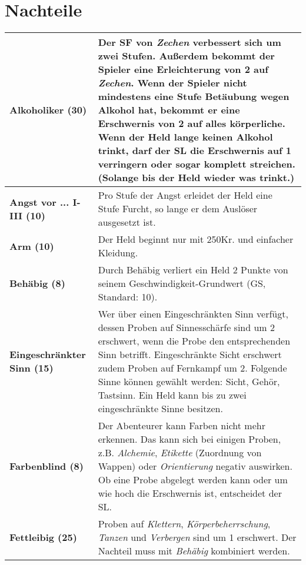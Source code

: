 \section{Nachteile}
\label{chap:nachteile}
\begin{longtable}{|p{5cm}|p{11cm}|}
\hline

\textbf{Alkoholiker (30)} & Der SF von \textit{Zechen} verbessert sich um zwei Stufen. Außerdem bekommt der Spieler eine Erleichterung von 2 auf \textit{Zechen}. Wenn der Spieler nicht mindestens eine Stufe Betäubung wegen Alkohol hat, bekommt er eine Erschwernis von 2 auf alles körperliche. Wenn der Held lange keinen Alkohol trinkt, darf der SL die Erschwernis auf 1 verringern oder sogar komplett streichen. (Solange bis der Held wieder was trinkt.) \\ \hline

\textbf{Angst vor ... I-III (10)} & Pro Stufe der Angst erleidet der Held eine Stufe Furcht, so lange er dem Auslöser ausgesetzt ist. \\ \hline

\textbf{Arm (10)} & Der Held beginnt nur mit 250Kr. und einfacher Kleidung. \\ \hline

\textbf{Behäbig (8)} & Durch Behäbig verliert ein Held 2 Punkte von seinem Geschwindigkeit-Grundwert (GS, Standard: 10). \\ \hline

\textbf{Eingeschränkter Sinn (15)} & Wer über einen Eingeschränkten Sinn verfügt, dessen Proben auf Sinnesschärfe sind um 2 erschwert, wenn die Probe den entsprechenden Sinn betrifft. Eingeschränkte Sicht erschwert zudem Proben auf Fernkampf um 2. Folgende Sinne können gewählt werden: Sicht, Gehör, Tastsinn. Ein Held kann bis zu zwei eingeschränkte Sinne besitzen. \\ \hline

\textbf{Farbenblind (8)} & Der Abenteurer kann Farben nicht mehr erkennen. Das kann sich bei einigen Proben, z.B. \textit{Alchemie}, \textit{Etikette} (Zuordnung von Wappen) oder \textit{Orientierung} negativ auswirken. Ob eine Probe abgelegt werden kann oder um wie hoch die Erschwernis ist, entscheidet der SL. \\ \hline

\textbf{Fettleibig (25)} & Proben auf \textit{Klettern}, \textit{Körperbeherrschung}, \textit{Tanzen} und \textit{Verbergen} sind um 1 erschwert. Der Nachteil muss mit \textit{Behäbig} kombiniert werden. \\ \hline


\end{longtable}
